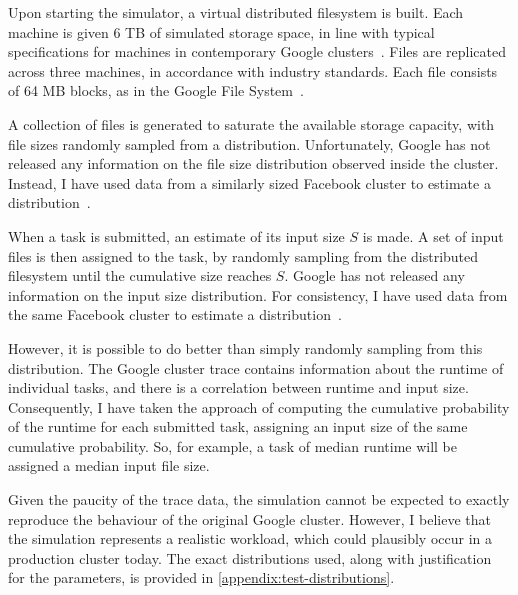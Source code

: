 Upon starting the simulator, a virtual distributed filesystem is built. Each machine is given 6 TB of simulated storage space, in line with typical specifications for machines in contemporary Google clusters~\cite{Fikes:2010}. Files are replicated across three machines, in accordance with industry standards\footnotemark. Each file consists of 64 MB blocks, as in the Google File System~\cite{Ghemawat:2003}.

A collection of files is generated to saturate the available storage capacity\footnotemark, with file sizes randomly sampled from a distribution. Unfortunately, Google has not released any information on the file size distribution observed inside the cluster. Instead, I have used data from a similarly sized Facebook cluster to estimate a distribution~\cite{Chen:2012}.

When a task is submitted, an estimate of its input size $S$ is made. A set of input files is then assigned to the task, by randomly sampling from the distributed filesystem until the cumulative size reaches $S$. Google has not released any information on the input size distribution. For consistency, I have used data from the same Facebook cluster to estimate a distribution~\cite{Chen:2012}.

However, it is possible to do better than simply randomly sampling from this distribution. The Google cluster trace contains information about the runtime of individual tasks, and there is a correlation between runtime and input size. Consequently, I have taken the approach of computing the cumulative probability of the runtime for each submitted task, assigning an input size of the same cumulative probability. So, for example, a task of median runtime will be assigned a median input file size.

Given the paucity of the trace data, the simulation cannot be expected to exactly reproduce the behaviour of the original Google cluster. However, I believe that the simulation represents a realistic workload, which could plausibly occur in a production cluster today. The exact distributions used, along with justification for the parameters, is provided in \cref{appendix:test-distributions}.

